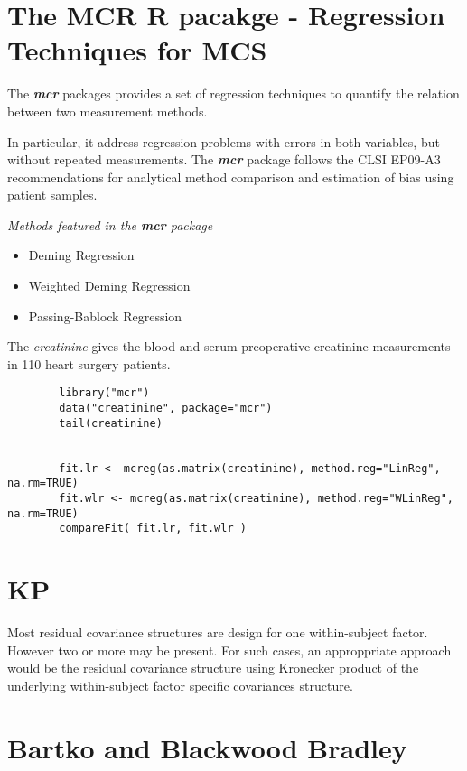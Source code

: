 \documentclass[MAIN.tex]{subfiles}
\begin{document}
	\section{The MCR R pacakge - Regression Techniques for MCS}
	
	The \textbf{\textit{mcr}} packages provides a set of regression techniques to quantify the relation between two measurement methods.
	
	In particular, it address regression problems with errors in both variables, but without repeated measurements.
	The \textbf{\textit{mcr}} package follows the CLSI EP09-A3 recommendations for analytical
	method comparison and estimation of bias using patient samples.
	
	
	\textit{Methods featured in the \textbf{mcr} package}
	
	\begin{itemize}
		\item Deming Regression
		\item Weighted Deming Regression
		\item Passing-Bablock Regression
	\end{itemize}
	
	The \textit{creatinine} gives the blood and serum preoperative creatinine measurements in 110 heart surgery patients.
	
	\begin{framed}
		\begin{verbatim}
		library("mcr")
		data("creatinine", package="mcr")
		tail(creatinine)
		
		
		fit.lr <- mcreg(as.matrix(creatinine), method.reg="LinReg", na.rm=TRUE)
		fit.wlr <- mcreg(as.matrix(creatinine), method.reg="WLinReg", na.rm=TRUE)
		compareFit( fit.lr, fit.wlr )
		\end{verbatim}
	\end{framed}
	
	

	\section{KP}
	Most residual covariance structures are design for one
	within-subject factor. However two or more may be present. For
	such cases, an approppriate approach would be the residual
	covariance structure using Kronecker product of the underlying
	within-subject factor specific covariances structure.
	
	

\section{Bartko and Blackwood Bradley}
\end{document}
